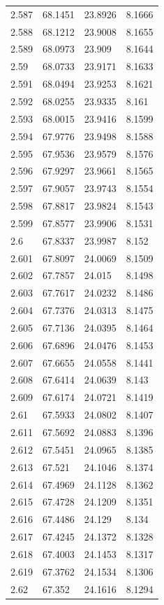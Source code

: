 \begin{tabular}{llll}
2.587 & 68.1451 & 23.8926 & 8.1666 \\
2.588 & 68.1212 & 23.9008 & 8.1655 \\
2.589 & 68.0973 & 23.909 & 8.1644 \\
2.59 & 68.0733 & 23.9171 & 8.1633 \\
2.591 & 68.0494 & 23.9253 & 8.1621 \\
2.592 & 68.0255 & 23.9335 & 8.161 \\
2.593 & 68.0015 & 23.9416 & 8.1599 \\
2.594 & 67.9776 & 23.9498 & 8.1588 \\
2.595 & 67.9536 & 23.9579 & 8.1576 \\
2.596 & 67.9297 & 23.9661 & 8.1565 \\
2.597 & 67.9057 & 23.9743 & 8.1554 \\
2.598 & 67.8817 & 23.9824 & 8.1543 \\
2.599 & 67.8577 & 23.9906 & 8.1531 \\
2.6 & 67.8337 & 23.9987 & 8.152 \\
2.601 & 67.8097 & 24.0069 & 8.1509 \\
2.602 & 67.7857 & 24.015 & 8.1498 \\
2.603 & 67.7617 & 24.0232 & 8.1486 \\
2.604 & 67.7376 & 24.0313 & 8.1475 \\
2.605 & 67.7136 & 24.0395 & 8.1464 \\
2.606 & 67.6896 & 24.0476 & 8.1453 \\
2.607 & 67.6655 & 24.0558 & 8.1441 \\
2.608 & 67.6414 & 24.0639 & 8.143 \\
2.609 & 67.6174 & 24.0721 & 8.1419 \\
2.61 & 67.5933 & 24.0802 & 8.1407 \\
2.611 & 67.5692 & 24.0883 & 8.1396 \\
2.612 & 67.5451 & 24.0965 & 8.1385 \\
2.613 & 67.521 & 24.1046 & 8.1374 \\
2.614 & 67.4969 & 24.1128 & 8.1362 \\
2.615 & 67.4728 & 24.1209 & 8.1351 \\
2.616 & 67.4486 & 24.129 & 8.134 \\
2.617 & 67.4245 & 24.1372 & 8.1328 \\
2.618 & 67.4003 & 24.1453 & 8.1317 \\
2.619 & 67.3762 & 24.1534 & 8.1306 \\
2.62 & 67.352 & 24.1616 & 8.1294 \\

\end{tabular}
